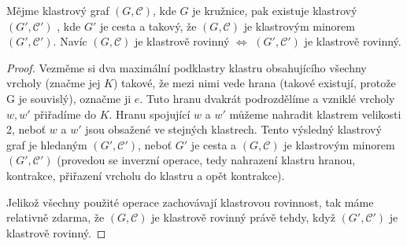 \begin{theorem}
Mějme klastrový graf $(G, \mathcal C)$, kde $G$ je kružnice, pak existuje klastrový $(G', \mathcal C')$ , kde $G'$ je cesta a takový, že $(G, \mathcal C)$ je klastrovým minorem $(G', \mathcal C')$. Navíc $(G, \mathcal C)$ je klastrově rovinný $\iff$ $(G', \mathcal C')$ je klastrově rovinný.
\end{theorem}
\begin{proof}
Vezměme si dva maximální podklastry klastru obsahujícího všechny vrcholy (značme jej $K$) takové, že mezi nimi vede hrana (takové existují, protože G je souvislý), označme ji $e$. Tuto hranu dvakrát podrozdělíme a vzniklé vrcholy $w, w'$ přiřadíme do $K$. Hranu spojující $w$ a $w'$ můžeme nahradit klastrem velikosti 2, neboť $w$ a $w'$ jsou obsažené ve stejných klastrech. Tento výsledný klastrový graf je hledaným $(G', \mathcal C')$, neboť $G'$ je cesta a $(G, \mathcal C)$ je klastrovým minorem $(G', \mathcal C')$ (provedou se inverzní operace, tedy nahrazení klastru hranou, kontrakce, přiřazení vrcholu do klastru a opět kontrakce).

Jelikož všechny použité operace zachovávají klastrovou rovinnost, tak máme relativně zdarma, že $(G, \mathcal C)$ je klastrově rovinný právě tehdy, když $(G', \mathcal C')$ je klastrově rovinný.
\end{proof}